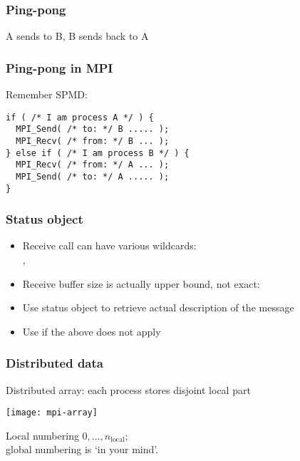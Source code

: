 \begin{frame}\frametitle{Ping-pong}
  A sends to B, B sends back to A

\end{frame}

\begin{frame}[containsverbatim]\frametitle{Ping-pong in MPI}
Remember SPMD:
\lstset{language=C}
\begin{lstlisting}
if ( /* I am process A */ ) {
  MPI_Send( /* to: */ B ..... );
  MPI_Recv( /* from: */ B ... );
} else if ( /* I am process B */ ) {
  MPI_Recv( /* from: */ A ... );
  MPI_Send( /* to: */ A ..... );
}
\end{lstlisting}
\end{frame}


\begin{frame}[containsverbatim]\frametitle{Status object}
  \begin{itemize}
  \item Receive call can have various wildcards:\\
    , 
  \item Receive buffer size is actually upper bound, not exact:
  \item Use status object to retrieve actual description of the message
  \item Use  if the above does not apply
  \end{itemize}
\end{frame}

\begin{exerciseframe}[pingpong]
  
\end{exerciseframe}

\begin{frame}[containsverbatim]
\end{frame}


\begin{frame}[containsverbatim]\frametitle{Distributed data}
  Distributed array: each process stores disjoint local part
  
  \texttt{[image: mpi-array]}

  Local numbering $0,\ldots,n_{\mathrm{local}}$;\\
  global numbering is `in your mind'.
\end{frame}

